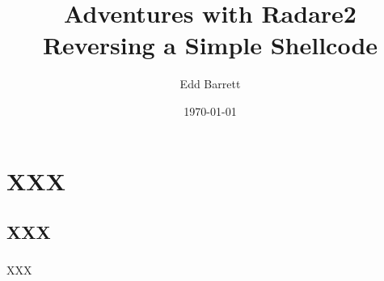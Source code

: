 \documentclass{beamer}
\title{Adventures with Radare2\\Reversing a Simple Shellcode}
\author{Edd Barrett}
\date{\today}
\institute{%
  canthack.org
}
\begin{document}
\begin{frame}
  \titlepage
\end{frame}

\section{XXX}

\subsection{XXX}
\begin{frame}[fragile]
\frametitle{\insertsubsection}

XXX

\end{frame}
\end{document}
